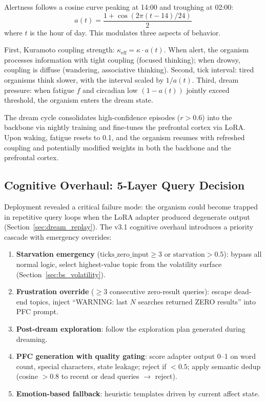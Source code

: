 \documentclass[11pt,a4paper,twocolumn]{article}
\begin{document}
Alertness follows a cosine curve peaking at 14:00 and troughing at 02:00:
\begin{equation}
a(t) = \frac{1 + \cos(2\pi(t - 14)/24)}{2}
\label{eq:circadian}
\end{equation}
where $t$ is the hour of day.
This modulates three aspects of behavior.

First, Kuramoto coupling strength: $\kappa_{\mathrm{eff}} = \kappa \cdot a(t)$.
When alert, the organism processes information with tight coupling (focused thinking); when drowsy, coupling is diffuse (wandering, associative thinking).
Second, tick interval: tired organisms think slower, with the interval scaled by $1/a(t)$.
Third, dream pressure: when fatigue $f$ and circadian low $(1 - a(t))$ jointly exceed threshold, the organism enters the dream state.

The dream cycle consolidates high-confidence episodes ($r > 0.6$) into the backbone via nightly training and fine-tunes the prefrontal cortex via LoRA.
Upon waking, fatigue resets to 0.1, and the organism resumes with refreshed coupling and potentially modified weights in both the backbone and the prefrontal cortex.

\subsection{Cognitive Overhaul: 5-Layer Query Decision}

Deployment revealed a critical failure mode: the organism could become trapped in repetitive query loops when the LoRA adapter produced degenerate output (Section~\ref{sec:dream_replay}).
The v3.1 cognitive overhaul introduces a priority cascade with emergency overrides:

\begin{enumerate}
\item \textbf{Starvation emergency} ($\text{ticks\_zero\_input} \geq 3$ or $\text{starvation} > 0.5$): bypass all normal logic, select highest-value topic from the volatility surface (Section~\ref{sec:bs_volatility}).
\item \textbf{Frustration override} ($\geq 3$ consecutive zero-result queries): escape dead-end topics, inject ``WARNING: last $N$ searches returned ZERO results'' into PFC prompt.
\item \textbf{Post-dream exploration}: follow the exploration plan generated during dreaming.
\item \textbf{PFC generation with quality gating}: score adapter output 0--1 on word count, special characters, state leakage; reject if $< 0.5$; apply semantic dedup (cosine $> 0.8$ to recent or dead queries $\to$ reject).
\item \textbf{Emotion-based fallback}: heuristic templates driven by current affect state.
\end{enumerate}
\end{document}
